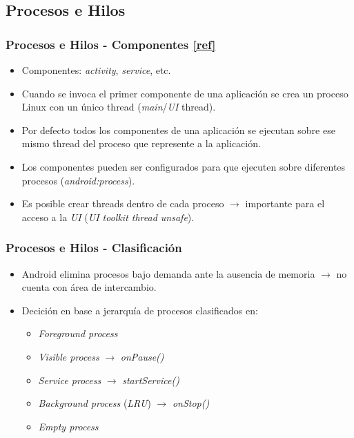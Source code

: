 \subsection{Procesos e Hilos}
\begin{frame}
  \frametitle{Procesos e Hilos - Componentes \href{https://developer.android.com/guide/components/index.html}{[ref]}}
  \begin{itemize}
    \item Componentes: \textit{activity}, \textit{service}, etc.

    \item Cuando se invoca el primer componente de una aplicación se crea un proceso Linux con un único thread (\textit{main}/\textit{UI} thread).
    
    \item Por defecto todos los componentes de una aplicación se ejecutan sobre ese mismo thread del proceso que represente a la aplicación.
    
    \item Los componentes pueden ser configurados para que ejecuten sobre diferentes procesos (\textit{android:process}).
    
    \item Es posible crear threads dentro de cada proceso $\rightarrow$ importante para el acceso a la \textit{UI} (\emph{UI toolkit thread unsafe}).
  \end{itemize}
\end{frame}

\begin{frame}
  \frametitle{Procesos e Hilos - Clasificación}
  \begin{itemize}
    \item Android elimina procesos bajo demanda ante la ausencia de memoria $\rightarrow$ no cuenta con área de intercambio.
    
    \item Decición en base a jerarquía de procesos clasificados en:
    \begin{itemize}
     \item \textit{Foreground process}
     \item \textit{Visible process} $\rightarrow$ \textit{onPause()}
     \item \textit{Service process} $\rightarrow$ \textit{startService()}
     \item \textit{Background process} (\emph{LRU}) $\rightarrow$ \textit{onStop()}
     \item \textit{Empty process}
    \end{itemize}       
  \end{itemize}
\end{frame}


